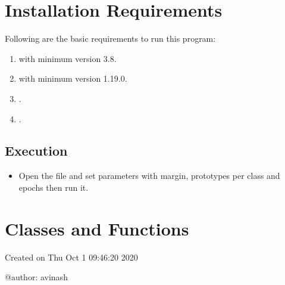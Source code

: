 \documentclass[letterpaper,10pt,english]{sphinxmanual}
\begin{document}
\chapter{Installation Requirements}
\label{\detokenize{index:installation-requirements}}
Following are the basic requirements to run this program:
\begin{enumerate}
\def\theenumi{\arabic{enumi}}
\def\labelenumi{\theenumi .}
\makeatletter\def\p@enumii{\p@enumi \theenumi .}\makeatother
\item {} 
 with minimum version 3.8.

\item {} 
 with minimum version 1.19.0.

\item {} 
.

\item {} 
 .

\end{enumerate}


\section{Execution}
\label{\detokenize{index:execution}}\begin{itemize}
\item {} 
Open the  file and set parameters with margin, prototypes per class and epochs then run it.

\end{itemize}


\chapter{Classes and Functions}
\label{\detokenize{index:module-lmlvq_distance}}\label{\detokenize{index:classes-and-functions}}
Created on Thu Oct  1 09:46:20 2020

@author: avinash
\end{document}
